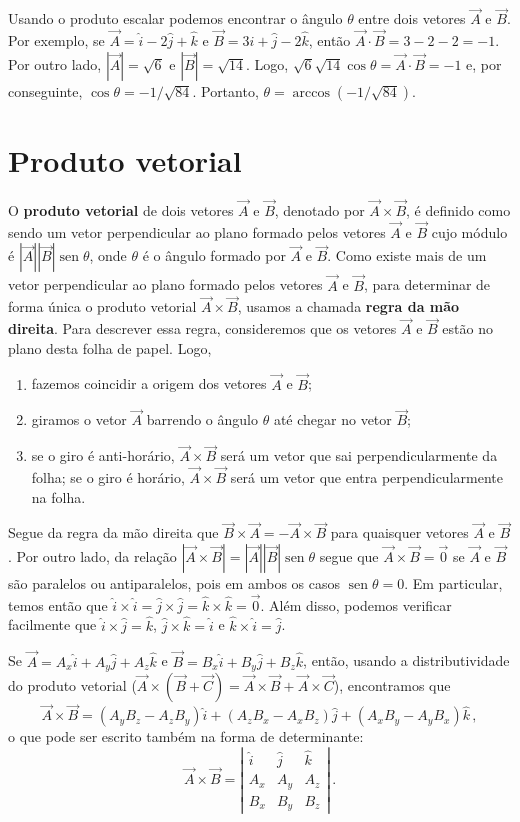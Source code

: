 \documentclass[12pt, a4paper]{article}
\DeclareMathOperator{\sen}{sen}
\begin{document}
Usando o produto escalar podemos encontrar o ângulo $\theta$ entre dois vetores $\vec A$ e $\vec B$. Por exemplo, se $\vec A=\hat i-2\hat j+\hat k$ e $\vec B=3\hat i+\hat j-2\hat k$, então $\vec A\cdot\vec B=3-2-2=-1$. Por outro lado, $|\vec A|=\sqrt{6}$ e $|\vec B|=\sqrt{14}$. Logo, $\sqrt{6}\sqrt{14}\cos\theta=\vec A\cdot\vec B=-1$ e, por conseguinte, $\cos\theta=-1/\sqrt{84}$. Portanto, $\theta=\arccos(-1/\sqrt{84})$.

\section{Produto vetorial}
O \textbf{produto vetorial} de dois vetores $\vec A$ e $\vec B$, denotado por $\vec A\times \vec B$, é definido como sendo um vetor perpendicular ao plano formado pelos vetores $\vec A$ e $\vec B$ cujo módulo é $|\vec A||\vec B|\sen\theta$, onde $\theta$ é o ângulo formado por $\vec A$ e $\vec B$. Como existe mais de um vetor perpendicular ao plano formado pelos vetores $\vec A$ e $\vec B$, para determinar de forma única o produto vetorial $\vec A\times \vec B$, usamos a chamada \textbf{regra da mão direita}. Para descrever essa regra, consideremos que os vetores $\vec A$ e $\vec B$ estão no plano desta folha de papel. Logo,
\begin{enumerate}
	\item fazemos coincidir a origem dos vetores $\vec A$ e $\vec B$;
	\item giramos o vetor $\vec A$ barrendo o ângulo $\theta$ até chegar no vetor $\vec B$;
	\item se o giro é anti-horário, $\vec A\times \vec B$ será um vetor que sai perpendicularmente da folha; se o giro é horário, $\vec A\times\vec B$ será um vetor que entra perpendicularmente na folha.
\end{enumerate}

Segue da regra da mão direita que $\vec B\times\vec A=-\vec A\times\vec B$ para quaisquer vetores $\vec A$ e $\vec B$. Por outro lado, da relação $|\vec A\times\vec B|=|\vec A||\vec B|\sen\theta$ segue que $\vec A\times\vec B=\vec 0$ se $\vec A$ e $\vec B$ são paralelos ou antiparalelos, pois em ambos os casos $\sen\theta=0$. Em particular, temos então que $\hat i\times \hat i=\hat j\times \hat j=\hat k\times \hat k=\vec 0$. Além disso, podemos verificar facilmente que $\hat i\times \hat j=\hat k$, $\hat j\times \hat k=\hat i$ e $\hat k\times \hat i=\hat j$.

Se $\vec A=A_x\hat i+A_y\hat j+A_z\hat k$ e $\vec B=B_x\hat i+B_y\hat j+B_z\hat k$, então, usando a distributividade do produto vetorial ($\vec A\times(\vec B+\vec C)=\vec A\times\vec B+\vec A\times\vec C$), encontramos que
$$\vec A\times\vec B=(A_yB_z-A_zB_y)\hat i+(A_zB_x-A_xB_z)\hat j+(A_xB_y-A_yB_x)\hat k\,,$$
o que pode ser escrito também na forma de determinante:
$$\vec A\times\vec B=\left|
\begin{array}{ccc}
\hat i&\hat j&\hat k\\
A_x&A_y&A_z\\
B_x&B_y&B_z
\end{array}\right|\,.$$
\end{document}
